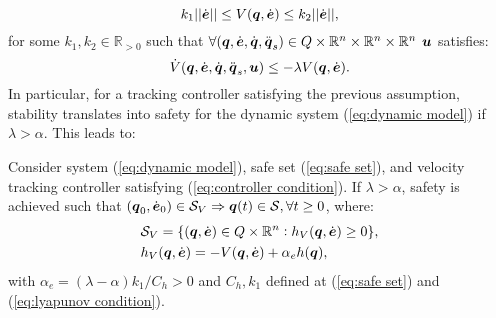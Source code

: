 \begin{equation} \label{eq:lyapunov condition}
    k_1 || \dot{\boldsymbol{e}}|| \leq V({\boldsymbol{q}}, \dot{\boldsymbol{e}}) \leq k_2 || \dot{\boldsymbol{e}}||,
\end{equation}
for some $k_1,k_2\in \mathbb{R}_{>0}$ such that $\forall({\boldsymbol{q}},\dot{\boldsymbol{e}},\dot{{\boldsymbol{q}}},\ddot{{\boldsymbol{q}}}_s)\in Q \times \mathbb{R}^n \times \mathbb{R}^n \times \mathbb{R}^n$ $\boldsymbol{u}$ satisfies:
\begin{equation} \label{eq:controller condition}
    \dot{V}({\boldsymbol{q}},\dot{\boldsymbol{e}},\dot{{\boldsymbol{q}}},\ddot{{\boldsymbol{q}}}_s,\boldsymbol{u}) \leq -\lambda V({\boldsymbol{q}},\dot{\boldsymbol{e}}).
\end{equation}
In particular, for a tracking controller satisfying the previous assumption, stability translates into safety for the dynamic system (\ref{eq:dynamic model}) if $\lambda > \alpha$. This leads to:
\begin{theorem}\label{th:alpha limit}
    Consider system (\ref{eq:dynamic model}), safe set (\ref{eq:safe set}), and velocity tracking controller satisfying (\ref{eq:controller condition}). If $\lambda > \alpha$, safety is achieved such that $({\boldsymbol{q}}_0,\dot{\boldsymbol{e}}_0)\in \mathcal{S}_V \Rightarrow {\boldsymbol{q}}(t) \in \mathcal{S}, \forall t\geq 0$, where:
    \begin{align}
        &\mathcal{S}_V = \{ ({\boldsymbol{q}},\dot{\boldsymbol{e}})\in Q \times \mathbb{R}^n: h_V({\boldsymbol{q}},\dot{\boldsymbol{e}})\geq 0 \},\\
        &h_V({\boldsymbol{q}},\dot{\boldsymbol{e}}) = -V({\boldsymbol{q}},\dot{\boldsymbol{e}})+ \alpha_e h({\boldsymbol{q}}), \label{eq:h_V}
    \end{align}
    with $\alpha_e = (\lambda - \alpha)k_1/C_h > 0$ and $C_h,k_1$ defined at (\ref{eq:safe set}) and (\ref{eq:lyapunov condition}).
\end{theorem}
